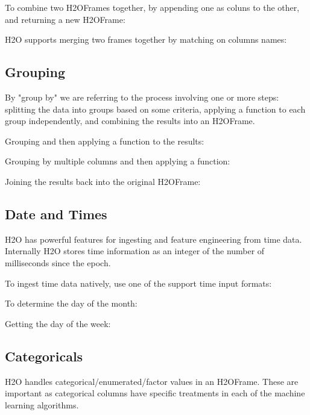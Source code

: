 To combine two H2OFrames together, by appending one as coluns to the other,
and returning a new H2OFrame:


H2O supports merging two frames together by matching on columns names:


\subsection{Grouping}
By "group by" we are referring to the process involving one or more steps: splitting the
data into groups based on some criteria, applying a function to each group independently,
and combining the results into an H2OFrame.

Grouping and then applying a function to the results:


Grouping by multiple columns and then applying a function:


Joining the results back into the original H2OFrame:


\subsection{Date and Times}
H2O has powerful features for ingesting and feature engineering from time data.  Internally H2O
stores time information as an integer of the number of milliseconds since the epoch.

To ingest time data natively, use one of the support time input formats:


To determine the day of the month:


Getting the day of the week:


\subsection{Categoricals}
H2O handles categorical/enumerated/factor values in an H2OFrame.  These are important as categorical
columns have specific treatments in each of the machine learning algorithms.

